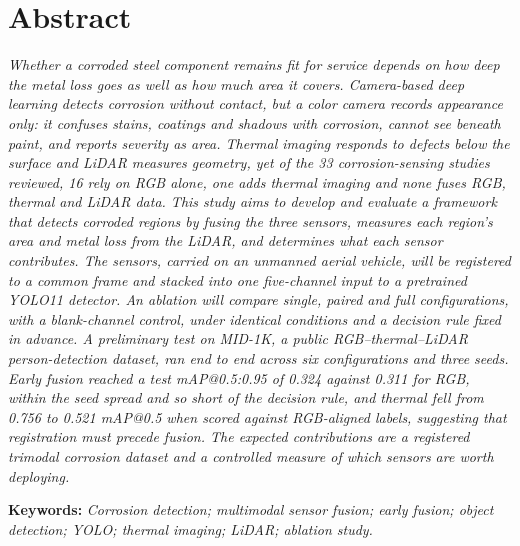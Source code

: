 \chapter*{Abstract}

\emph{Whether a corroded steel component remains fit for service depends on
how deep the metal loss goes as well as how much area it covers. Camera-based
deep learning detects corrosion without contact, but a color camera records
appearance only: it confuses stains, coatings and shadows with corrosion, cannot
see beneath paint, and reports severity as area. Thermal imaging responds to
defects below the surface and LiDAR measures geometry, yet of the 33
corrosion-sensing studies reviewed, 16 rely on RGB alone, one adds thermal
imaging and none fuses RGB, thermal and LiDAR data. This study aims to develop and
evaluate a framework that detects corroded regions by fusing the three sensors,
measures each region's area and metal loss from the LiDAR, and determines what
each sensor contributes. The sensors, carried on an unmanned aerial vehicle, will
be registered to a common frame and stacked into one five-channel input to a
pretrained YOLO11 detector. An ablation will compare single, paired and full
configurations, with a blank-channel control, under identical conditions and a
decision rule fixed in advance. A preliminary test on MID-1K, a public
RGB--thermal--LiDAR person-detection dataset, ran end to end across six
configurations and three seeds. Early fusion reached a test mAP@0.5:0.95 of 0.324
against 0.311 for RGB, within the seed spread and so short of the decision rule,
and thermal fell from 0.756 to 0.521 mAP@0.5 when scored against RGB-aligned
labels, suggesting that registration must precede fusion. The expected
contributions are a registered trimodal corrosion dataset and a controlled
measure of which sensors are worth deploying.}

\vspace{0.8\baselineskip}

\noindent\textbf{Keywords:} \emph{Corrosion detection; multimodal sensor
fusion; early fusion; object detection; YOLO; thermal imaging; LiDAR; ablation
study.}
